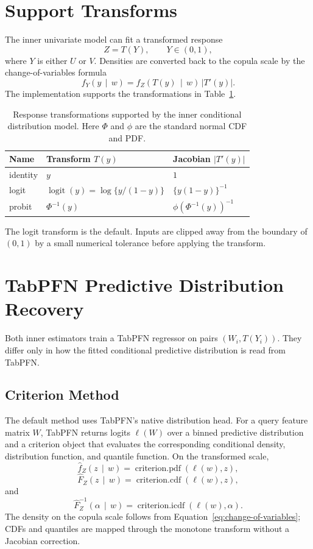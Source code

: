 \documentclass[11pt]{article}
\newcommand{\given}{\,\mid\,}
\newcommand{\logit}{\operatorname{logit}}
\begin{document}
\section{Support Transforms}

The inner univariate model can fit a transformed response
\[
  Z = T(Y),
  \qquad Y \in (0,1),
\]
where $Y$ is either $U$ or $V$. Densities are converted back to the
copula scale by the change-of-variables formula
\begin{equation}
  f_Y(y \given w)
  =
  f_Z(T(y) \given w)\,\left|T'(y)\right|.
  \label{eq:change-of-variables}
\end{equation}
The implementation supports the transformations in
Table~\ref{tab:transforms}.

\begin{table}[h]
  \centering
  \begin{tabular}{lll}
    \toprule
    Name & Transform $T(y)$ & Jacobian $\left|T'(y)\right|$ \\
    \midrule
    identity & $y$ & $1$ \\
    logit & $\logit(y)=\log\{y/(1-y)\}$ & $\{y(1-y)\}^{-1}$ \\
    probit & $\Phi^{-1}(y)$ & $\phi(\Phi^{-1}(y))^{-1}$ \\
    \bottomrule
  \end{tabular}
  \caption{Response transformations supported by the inner conditional
  distribution model. Here $\Phi$ and $\phi$ are the standard normal CDF
  and PDF.}
  \label{tab:transforms}
\end{table}

The logit transform is the default. Inputs are clipped away from the
boundary of $(0,1)$ by a small numerical tolerance before applying the
transform.

\section{TabPFN Predictive Distribution Recovery}

Both inner estimators train a TabPFN regressor on pairs
$(W_i,T(Y_i))$. They differ only in how the fitted conditional
predictive distribution is read from TabPFN.

\subsection{Criterion Method}

The default method uses TabPFN's native distribution head. For a query
feature matrix $W$, TabPFN returns logits $\ell(W)$ over a binned
predictive distribution and a criterion object that evaluates the
corresponding conditional density, distribution function, and quantile
function. On the transformed scale,
\[
  \widehat f_Z(z \given w)
  =
  \operatorname{criterion.pdf}(\ell(w), z),
\]
\[
  \widehat F_Z(z \given w)
  =
  \operatorname{criterion.cdf}(\ell(w), z),
\]
and
\[
  \widehat F_Z^{-1}(\alpha \given w)
  =
  \operatorname{criterion.icdf}(\ell(w), \alpha).
\]
The density on the copula scale follows from
Equation~\eqref{eq:change-of-variables}; CDFs and quantiles are mapped
through the monotone transform without a Jacobian correction.
\end{document}
